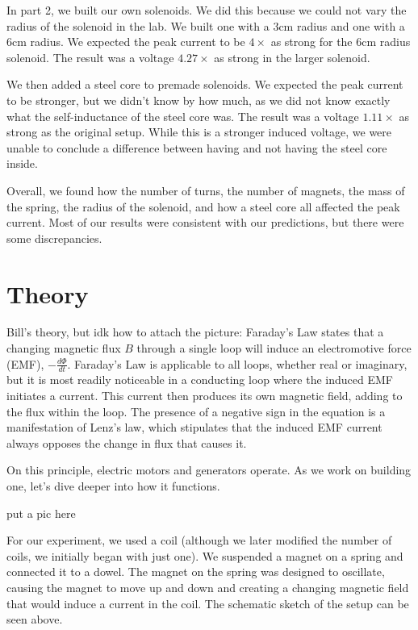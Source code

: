 \documentclass[11pt]{article}
\let\oldsection\section
\renewcommand\section{\clearpage\oldsection}
\begin{document}
    In part 2, we built our own solenoids.
    We did this because we could not vary the radius of the solenoid in the lab.
    We built one with a 3cm radius and one with a 6cm radius.
    We expected the peak current to be $4 \times$ as strong for the 6cm radius solenoid.
    The result was a voltage $4.27 \times$ as strong in the larger solenoid.

    We then added a steel core to premade solenoids.
    We expected the peak current to be stronger, but we didn't know by how much, as we did not know exactly what the self-inductance of the steel core was.
    The result was a voltage $1.11 \times$ as strong as the original setup. While this is a stronger induced voltage, we were unable to conclude a difference between having and not having the steel core inside.

    Overall, we found how the number of turns, the number of magnets, the mass of the spring, the radius of the solenoid, and how a steel core all affected the peak current.
    Most of our results were consistent with our predictions, but there were some discrepancies.

    \section*{Theory}\label{sec:theory}


Bill's theory, but idk how to attach the picture:
Faraday’s Law states that a changing magnetic flux \(B\) through a single loop will induce an electromotive force (EMF), \(-\frac{d\Phi}{dt}\). Faraday’s Law is applicable to all loops, whether real or imaginary, but it is most readily noticeable in a conducting loop where the induced EMF initiates a current. This current then produces its own magnetic field, adding to the flux within the loop. The presence of a negative sign in the equation is a manifestation of Lenz’s law, which stipulates that the induced EMF current always opposes the change in flux that causes it. 

On this principle, electric motors and generators operate. As we work on building one, let's dive deeper into how it functions.

put a pic here

For our experiment, we used a coil (although we later modified the number of coils, we initially began with just one). We suspended a magnet on a spring and connected it to a dowel. The magnet on the spring was designed to oscillate, causing the magnet to move up and down and creating a changing magnetic field that would induce a current in the coil. The schematic sketch of the setup can be seen above. 
\end{document}
